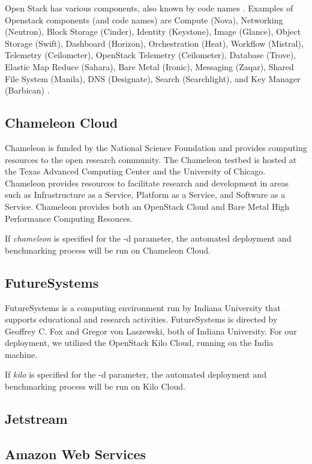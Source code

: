 \documentclass[9pt,twocolumn,twoside]{styles/osajnl}
\begin{document}
Open Stack has various components, also known by code names \cite{www-wikiOpenStack}.  Examples of Openstack components (and code names) are Compute (Nova), Networking (Neutron), Block Storage (Cinder), Identity (Keystone), Image (Glance), Object Storage (Swift), Dashboard (Horizon), Orchestration (Heat), Workflow (Mistral), Telemetry (Ceilometer), OpenStack Telemetry (Ceilometer), Database (Trove), Elastic Map Reduce (Sahara), Bare Metal (Ironic), Messaging (Zaqar), Shared File System (Manila), DNS (Designate), Search (Searchlight), and Key Manager (Barbican) \cite{www-wikiOpenStack}.

\subsection{Chameleon Cloud}

Chameleon is funded by the National Science Foundation and provides computing resources to the open research community.  The Chameleon testbed is hosted at the Texas Advanced Computing Center and the University of Chicago. Chameleon provides resources to facilitate research and development in areas such as Infrastructure as a Service, Platform as a Service, and Software as a Service.  Chameleon provides both an OpenStack Cloud and Bare Metal High Performance Computing Resouces. \cite{www-chamAbout}

If \emph{chameleon} is specified for the -d parameter, the automated deployment and benchmarking process will be run on Chameleon Cloud.

\subsection{FutureSystems}

FutureSystems is a computing environment run by Indiana University that supports educational and research activities. \cite{www-futureSystems} FutureSystems is directed by Geoffrey C. Fox and Gregor von Laszewski, both of Indiana University. \cite{www-fsAbout}  For our deployment, we utilized the OpenStack Kilo Cloud, running on the India machine.

If \emph{kilo} is specified for the -d parameter, the automated deployment and benchmarking process will be run on Kilo Cloud.

\subsection{Jetstream}

\subsection{Amazon Web Services}
\end{document}
